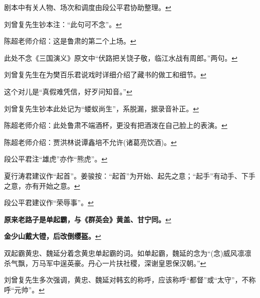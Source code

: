   剧本中有关人物、场次和调度由段公平君协助整理。\protect\hyperlink{fnref160}{↩}
\item
  \leavevmode\hypertarget{fn161}{}%
  刘曾复先生钞本注：``此句可不念''。\protect\hyperlink{fnref161}{↩}
\item
  \leavevmode\hypertarget{fn162}{}%
  陈超老师介绍：这是鲁肃的第二个上场。\protect\hyperlink{fnref162}{↩}
\item
  \leavevmode\hypertarget{fn163}{}%
  此处不念《三国演义》原文中``伏路把关饶子敬，临江水战有周郎。''两句。\protect\hyperlink{fnref163}{↩}
\item
  \leavevmode\hypertarget{fn164}{}%
  刘曾复先生在为樊百乐君说戏时详细介绍了藏书的做工和细节。\protect\hyperlink{fnref164}{↩}
\item
  \leavevmode\hypertarget{fn165}{}%
  这个对儿是``真假难凭信，好歹问知音。''\protect\hyperlink{fnref165}{↩}
\item
  \leavevmode\hypertarget{fn166}{}%
  刘曾复先生钞本此处记为``蝼蚁尚生''，系脱漏，据录音补正。\protect\hyperlink{fnref166}{↩}
\item
  \leavevmode\hypertarget{fn167}{}%
  陈超老师介绍：此处鲁肃不端酒杯，更没有把酒泼在自己脸上的表演。\protect\hyperlink{fnref167}{↩}
\item
  \leavevmode\hypertarget{fn168}{}%
  陈超老师介绍：贾洪林说谭鑫培不允许(诸葛亮饮酒)。\protect\hyperlink{fnref168}{↩}
\item
  \leavevmode\hypertarget{fn169}{}%
  段公平君注``雄虎''亦作``熊虎''。\protect\hyperlink{fnref169}{↩}
\item
  \leavevmode\hypertarget{fn170}{}%
  夏行涛君建议作``起首''。姜骏按：``起首''为开始、起先之意；``起手''有动手、下手之意，亦有开始之意。\protect\hyperlink{fnref170}{↩}
\item
  \leavevmode\hypertarget{fn171}{}%
  段公平君建议作``荣辱事''。\protect\hyperlink{fnref171}{↩}
\item
  \leavevmode\hypertarget{fn172}{}%
  \textbf{原来老路子是单起霸，与《群英会》黄盖、甘宁同。}\protect\hyperlink{fnref172}{↩}
\item
  \leavevmode\hypertarget{fn173}{}%
  \textbf{金少山戴大镫，后改倒缨盔。}\protect\hyperlink{fnref173}{↩}
\item
  \leavevmode\hypertarget{fn174}{}%
  双起霸黄忠、魏延分着念黄忠单起霸的词。如单起霸，魏延的念为``(念)威风凛凛杀气飘，万马军中逞英豪。丹心一片扶社稷，深谢皇恩保汉朝。''\protect\hyperlink{fnref174}{↩}
\item
  \leavevmode\hypertarget{fn175}{}%
  刘曾复先生多次强调，黄忠、魏延对韩玄的称呼，应该称呼``都督''或``太守''，不称呼``元帅''。\protect\hyperlink{fnref175}{↩}
